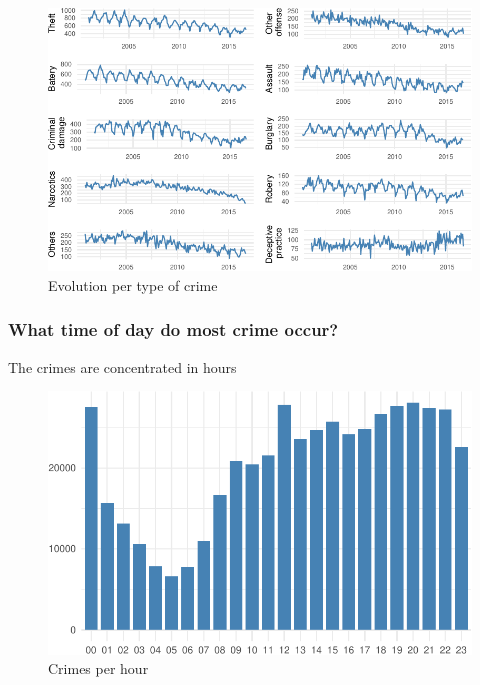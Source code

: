 \documentclass[]{article}
\begin{document}
\begin{figure}[H]

{\centering \includegraphics{Assessment_1v12_files/figure-latex/fig2-1} 

}

\caption{Evolution per type of crime}\label{fig:fig2}
\end{figure}

\subsubsection{What time of day do most crime
occur?}\label{what-time-of-day-do-most-crime-occur}

The crimes are concentrated in hours

\begin{figure}[H]

{\centering \includegraphics{Assessment_1v12_files/figure-latex/fig3-1} 

}

\caption{Crimes per hour}\label{fig:fig3}
\end{figure}
\end{document}
